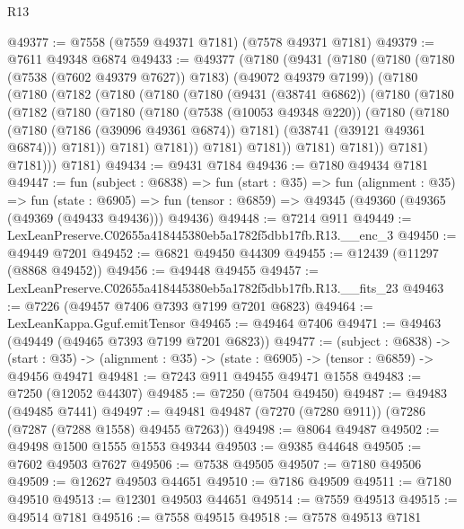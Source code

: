 \begin{lexlean}{R13}
\begin{coremodule}
@49377 := @7558 (@7559 @49371 @7181) (@7578 @49371 @7181)
@49379 := @7611 @49348 @6874
@49433 := @49377
    (@7180
      (@9431
        (@7180
          (@7180 (@7180 (@7538 (@7602 @49379 @7627)) @7183) (@49072 @49379 @7199))
          (@7180
            (@7180
              (@7182
                (@7180
                  (@7180
                    (@7180
                      (@9431 (@38741 @6862))
                      (@7180
                        (@7180
                          (@7182
                            (@7180
                              (@7180
                                (@7180
                                  (@7538 (@10053 @49348 @220))
                                  (@7180
                                    (@7180
                                      (@7180 (@7186 (@39096 @49361 @6874)) @7181)
                                      (@38741 (@39121 @49361 @6874)))
                                    @7181))
                                @7181)
                              @7181))
                          @7181)
                        @7181))
                    @7181)
                  @7181))
              @7181)
            @7181)))
      @7181)
@49434 := @9431 @7184
@49436 := @7180 @49434 @7181
@49447 := fun (subject : @6838) =>
  fun (start : @35) =>
  fun (alignment : @35) =>
  fun (state : @6905) =>
  fun (tensor : @6859) => @49345 (@49360 (@49365 (@49369 (@49433 @49436))) @49436)
@49448 := @7214 @911
@49449 := LexLeanPreserve.C02655a418445380eb5a1782f5dbb17fb.R13.__enc_3
@49450 := @49449 @7201
@49452 := @6821 @49450 @44309
@49455 := @12439 (@11297 (@8868 @49452))
@49456 := @49448 @49455
@49457 := LexLeanPreserve.C02655a418445380eb5a1782f5dbb17fb.R13.__fits_23
@49463 := @7226 (@49457 @7406 @7393 @7199 @7201 @6823)
@49464 := LexLeanKappa.Gguf.emitTensor
@49465 := @49464 @7406
@49471 := @49463 (@49449 (@49465 @7393 @7199 @7201 @6823))
@49477 := (subject : @6838) ->
  (start : @35) -> (alignment : @35) -> (state : @6905) -> (tensor : @6859) -> @49456 @49471
@49481 := @7243 @911 @49455 @49471 @1558
@49483 := @7250 (@12052 @44307)
@49485 := @7250 (@7504 @49450)
@49487 := @49483 (@49485 @7441)
@49497 := @49481 @49487 (@7270 (@7280 @911)) (@7286 (@7287 (@7288 @1558) @49455 @7263))
@49498 := @8064 @49487
@49502 := @49498 @1500 @1555 @1553 @49344
@49503 := @9385 @44648
@49505 := @7602 @49503 @7627
@49506 := @7538 @49505
@49507 := @7180 @49506
@49509 := @12627 @49503 @44651
@49510 := @7186 @49509
@49511 := @7180 @49510
@49513 := @12301 @49503 @44651
@49514 := @7559 @49513
@49515 := @49514 @7181
@49516 := @7558 @49515
@49518 := @7578 @49513 @7181

\end{coremodule}
\end{lexlean}
